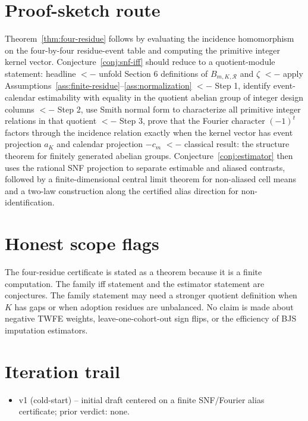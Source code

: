 \documentclass[11pt]{article}
\newcommand{\calR}{\mathcal{R}}
\theoremstyle{definition}
\theoremstyle{plain}
\theoremstyle{remark}
\begin{document}
\section{Proof-sketch route}
Theorem~\ref{thm:four-residue} follows by evaluating the incidence homomorphism on the four-by-four residue-event table and computing the primitive integer kernel vector. Conjecture~\ref{conj:snf-iff} should reduce to a quotient-module statement: headline $<- $ unfold Section 6 definitions of $B_{m,K,\calR}$ and $\zeta$ $<- $ apply Assumptions~\ref{ass:finite-residue}--\ref{ass:normalization} $<- $ Step 1, identify event-calendar estimability with equality in the quotient abelian group of integer design columns $<- $ Step 2, use Smith normal form to characterize all primitive integer relations in that quotient $<- $ Step 3, prove that the Fourier character $(-1)^t$ factors through the incidence relation exactly when the kernel vector has event projection $a_K$ and calendar projection $-c_m$ $<- $ classical result: the structure theorem for finitely generated abelian groups. Conjecture~\ref{conj:estimator} then uses the rational SNF projection to separate estimable and aliased contrasts, followed by a finite-dimensional central limit theorem for non-aliased cell means and a two-law construction along the certified alias direction for non-identification.

\section{Honest scope flags}
The four-residue certificate is stated as a theorem because it is a finite computation. The family iff statement and the estimator statement are conjectures. The family statement may need a stronger quotient definition when $K$ has gaps or when adoption residues are unbalanced. No claim is made about negative TWFE weights, leave-one-cohort-out sign flips, or the efficiency of BJS imputation estimators.

\section{Iteration trail}
\begin{itemize}[leftmargin=*]
\item v1 (cold-start) -- initial draft centered on a finite SNF/Fourier alias certificate; prior verdict: none.
\end{itemize}
\end{document}
